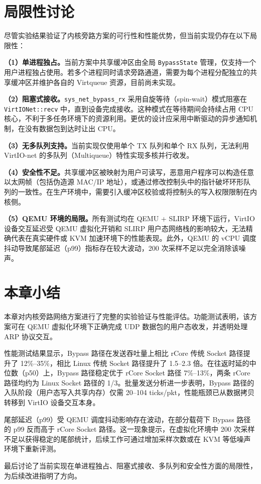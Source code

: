 \section{局限性讨论}
\label{sec:limitations}

尽管实验结果验证了内核旁路方案的可行性和性能优势，但当前实现仍存在以下局限性：

\textbf{（1）单进程独占。}当前方案中共享缓冲区由全局 \texttt{BypassState} 管理，仅支持一个用户进程独占使用。若多个进程同时请求旁路通道，需要为每个进程分配独立的共享缓冲区并维护各自的 Virtqueue 资源，目前尚未实现。

\textbf{（2）阻塞式接收。}\texttt{sys\_net\_bypass\_rx} 采用自旋等待（spin-wait）模式阻塞在 \texttt{VirtIONet::recv} 中，直到设备完成接收。这种模式在等待期间会持续占用 CPU 核心，不利于多任务环境下的资源利用。更优的设计应采用中断驱动的异步通知机制，在没有数据包到达时让出 CPU。

\textbf{（3）无多队列支持。}当前实现仅使用单个 TX 队列和单个 RX 队列，无法利用 VirtIO-net 的多队列（Multiqueue）特性实现多核并行收发。

\textbf{（4）安全性不足。}共享缓冲区被映射为用户可读写，恶意用户程序可以构造任意以太网帧（包括伪造源 MAC/IP 地址），或通过修改控制头中的指针破坏环形队列的一致性。在生产环境中，需要引入缓冲区校验或将控制头的写入权限限制在内核侧。

\textbf{（5）QEMU 环境的局限。}所有测试均在 QEMU + SLIRP 环境下运行，VirtIO 设备交互延迟受 QEMU 虚拟化开销和 SLIRP 用户态网络栈的影响较大，无法精确代表在真实硬件或 KVM 加速环境下的性能表现。此外，QEMU 的 vCPU 调度抖动导致尾部延迟（p99）指标存在较大波动，200 次采样不足以完全消除该噪声。


\section{本章小结}

本章对内核旁路网络方案进行了完整的实验验证与性能评估。功能测试表明，该方案可在 QEMU 虚拟化环境下正确完成 UDP 数据包的用户态收发，并透明处理 ARP 协议交互。

性能测试结果显示，Bypass 路径在发送吞吐量上相比 rCore 传统 Socket 路径提升了 12\%--35\%，相比 Linux 传统 Socket 路径提升了 1.5--2.3 倍。在往返时延的中位数（p50）上，Bypass 路径稳定优于 rCore Socket 路径 7\%--13\%，两条 rCore 路径均约为 Linux Socket 路径的 1/3。批量发送分析进一步表明，Bypass 路径的入队阶段（用户态写入共享内存）仅需 20--104 ticks/pkt，性能瓶颈已从数据拷贝转移到 VirtIO 设备交互本身。

尾部延迟（p99）受 QEMU 调度抖动影响存在波动，在部分载荷下 Bypass 路径的 p99 反而高于 rCore Socket 路径。这一现象提示，在虚拟化环境中 200 次采样不足以获得稳定的尾部统计，后续工作可通过增加采样次数或在 KVM 等低噪声环境下重新评测。

最后讨论了当前实现在单进程独占、阻塞式接收、多队列和安全性方面的局限性，为后续改进指明了方向。
